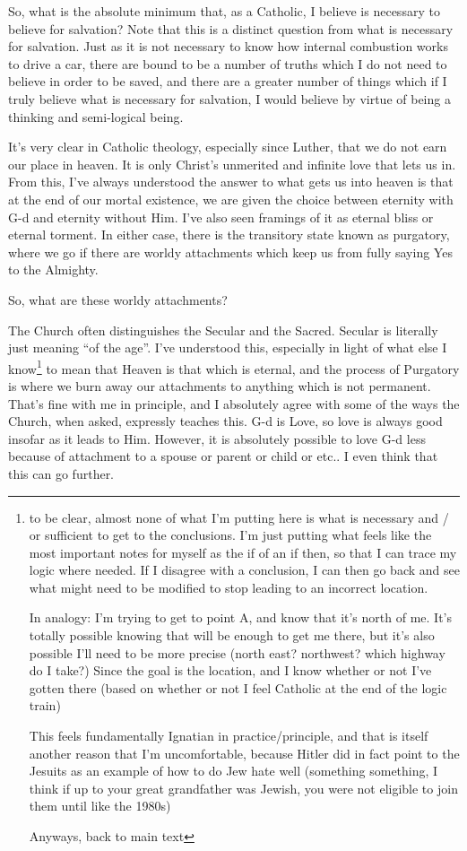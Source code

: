 \documentclass[12pt]{article}
\newcommand{\say}[1]{``#1''}
\renewcommand{\,}{\textsuperscript{,}}
\begin{document}
So, what is the absolute minimum that, as a Catholic, I believe is necessary to believe for salvation?  
Note that this is a distinct question from what is necessary for salvation.  
Just as it is not necessary to know how internal combustion works to drive a car, there are bound to be a number of truths which I do not need to believe in order to be saved, and there are a greater number of things which if I truly believe what is necessary for salvation, I would believe by virtue of being a thinking and semi-logical being.

It's very clear in Catholic theology, especially since Luther, that we do not earn our place in heaven.  
It is only Christ's unmerited and infinite love that lets us in.  
From this, I've always understood the answer to what gets us into heaven is that at the end of our mortal existence, we are given the choice between eternity with G-d and eternity without Him.  
I've also seen framings of it as eternal bliss or eternal torment.  
In either case, there is the transitory state known as purgatory, where we go if there are worldy attachments which keep us from fully saying Yes to the Almighty.

So, what are these worldy attachments?

The Church often distinguishes the Secular and the Sacred.  
Secular is literally just meaning \say{of the age}.  
I've understood this, especially in light of what else I know\footnote{to be clear, almost none of what I'm putting here is what is necessary and / or sufficient to get to the conclusions. I'm just putting what feels like the most important notes for myself as the if of an if then, so that I can trace my logic where needed. If I disagree with a conclusion, I can then go back and see what might need to be modified to stop leading to an incorrect location.

In analogy: I'm trying to get to point A, and know that it's north of me. It's totally possible knowing that will be enough to get me there, but it's also possible I'll need to be more precise (north east? northwest? which highway do I take?)  
Since the goal is the location, and I know whether or not I've gotten there (based on whether or not I feel Catholic at the end of the logic train)

This feels fundamentally Ignatian in practice/principle, and that is itself another reason that I'm uncomfortable, because Hitler did in fact point to the Jesuits as an example of how to do Jew hate well (something something, I think if up to your great grandfather was Jewish, you were not eligible to join them until like the 1980s)

Anyways, back to main text} to mean that Heaven is that which is eternal, and the process of Purgatory is where we burn away our attachments to anything which is not permanent.  
That's fine with me in principle, and I absolutely agree with some of the ways the Church, when asked, expressly teaches this.  
G-d is Love, so love is always good insofar as it leads to Him.  
However, it is absolutely possible to love G-d less because of attachment to a spouse or parent or child or etc..  
I even think that this can go further.
\end{document}
